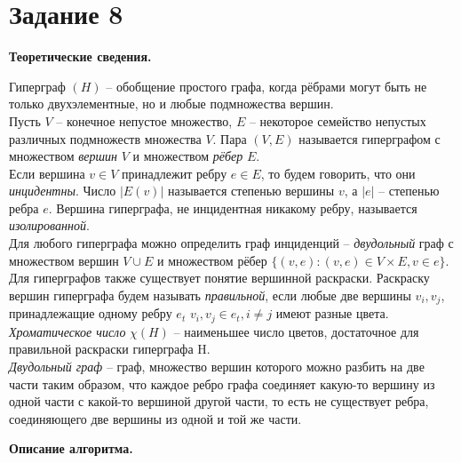 \documentclass[12pt,a4paper]{article}
\begin{document}
\pagebreak

\section*{Задание 8}
\begin{center}
   \textbf{Теоретические сведения.}
\end{center}
\setlength\parindent{24pt}

\indent Гиперграф $(H)$ -- обобщение простого графа, когда рёбрами могут быть не только двухэлементные, но и любые подмножества вершин. \\
Пусть $V$ -- конечное непустое множество, $E$ -- некоторое семейство непустых различных подмножеств множества $V$. Пара $(V,E)$ называется гиперграфом с множеством \textit{вершин} $V$ и множеством \textit{рёбер} $E$.\\
\indent Если вершина $v \in V$ принадлежит ребру $e \in E$, то будем говорить, что они \textit{инцидентны}. Число $|E(v)|$ называется степенью вершины $v$, а $|e|$ -- степенью ребра $e$. Вершина гиперграфа, не инцидентная никакому ребру, называется \textit{изолированной}.\\
\indent Для любого гиперграфа можно определить граф инциденций -- \textit{двудольный} граф с множеством вершин $V \cup E$ и множеством рёбер $\{(v,e):(v,e) \in V \times E, v \in e \}$.\\
\indent Для гиперграфов также существует понятие вершинной раскраски. Раскраску вершин гиперграфа будем называть \textit{правильной}, если любые две вершины $v_i,v_j$, принадлежащие одному ребру $e_t$ $v_i, v_j \in e_t, i \ne j$ имеют разные цвета.\\
\indent \textit{Хроматическое число} $\chi(H)$ -- наименьшее число цветов, достаточное для правильной раскраски гиперграфа H.\\
\indent \textit{Двудольный граф} -- граф, множество вершин которого можно разбить на две части таким образом, что каждое ребро графа соединяет какую-то вершину из одной части с какой-то вершиной другой части, то есть не существует ребра, соединяющего две вершины из одной и той же части. \\[10pt]

\begin{center}
   \textbf{Описание алгоритма.}
\end{center}
\setlength\parindent{24pt}
\end{document}
